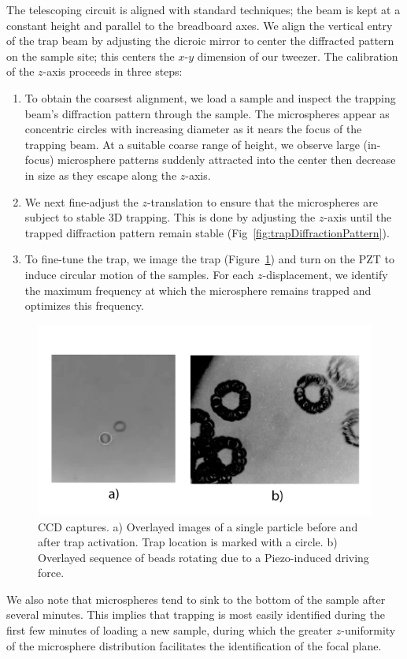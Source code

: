 \documentclass[aps,prb,twocolumn,superscriptaddress,floatfix,longbibliography,citeautoscript]{revtex4-2}
\begin{document}
The telescoping circuit is aligned with standard techniques; the beam is kept at a constant 
height and parallel to the breadboard axes. We align the vertical entry of the 
trap beam by adjusting the dicroic mirror to center the diffracted pattern on the sample site; 
this centers the $x$-$y$ dimension of our tweezer. 
The calibration of the $z$-axis proceeds in three steps: 
\begin{enumerate}
    \item To obtain the coarsest alignment, 
    we load a sample and inspect the trapping beam's diffraction 
    pattern through the sample. The microspheres appear as concentric circles with increasing diameter 
    as it nears the focus of the trapping beam. At a suitable coarse range of height, we observe large (in-focus) microsphere patterns suddenly attracted into the center then decrease in size as they escape along the $z$-axis. 
    \item We next fine-adjust the $z$-translation to ensure that the microspheres are subject to stable 3D trapping. 
    This is done by adjusting the $z$-axis until the trapped diffraction pattern remain stable (Fig~\ref{fig:trapDiffractionPattern}). 
    \item To fine-tune the trap, we image the trap (Figure~\ref{fig:trapCamera}) and turn on the PZT to induce circular motion of the samples. 
    For each $z$-displacement, we identify the maximum frequency at which the microsphere remains trapped and 
    optimizes this frequency. 
\end{enumerate}
\begin{figure} %
    \centering
    \includegraphics[width=1\linewidth]{./figs/bw.png}
    \caption{CCD captures. a) Overlayed images of a single particle before and after trap activation. Trap location is marked with a circle. b) Overlayed sequence of beads rotating due to a Piezo-induced driving force.}
    \label{fig:trapCamera}
\end{figure}
We also note that microspheres tend to sink to the bottom of the sample after several minutes. This implies that trapping is most easily identified during the first few minutes of loading a new sample, during which the greater $z$-uniformity of the microsphere distribution facilitates the identification of the focal plane. 
\end{document}
